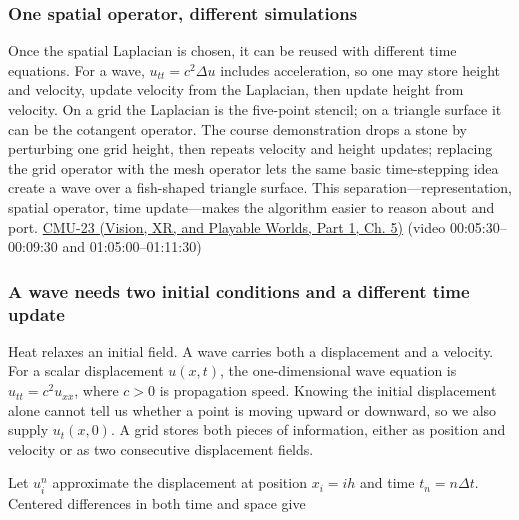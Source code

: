 \subsubsection{One spatial operator, different simulations}\label{04-visual-computing-ii-ch030-one-spatial-operator-different-simulations}

\hypertarget{04-visual-computing-ii-ch030-one-spatial-operator-different-simulations}{}

Once the spatial Laplacian is chosen, it can be reused with different time equations. For a wave, \(u_{tt}=c^2\Delta u\) includes acceleration, so one may store height and velocity, update velocity from the Laplacian, then update height from velocity. On a grid the Laplacian is the five-point stencil; on a triangle surface it can be the cotangent operator. The course demonstration drops a stone by perturbing one grid height, then repeats velocity and height updates; replacing the grid operator with the mesh operator lets the same basic time-stepping idea create a wave over a fish-shaped triangle surface. This separation---representation, spatial operator, time update---makes the algorithm easier to reason about and port. \href{../07-Vision-XR-and-Playable-Worlds-P01/main.pdf\#nameddest=04-visual-computing-ii-ch036-cmu-23---physically-based-animation-and-pdes}{CMU-23 (Vision, XR, and Playable Worlds, Part 1, Ch. 5)} (video 00:05:30--00:09:30 and 01:05:00--01:11:30)

\subsubsection{A wave needs two initial conditions and a different time update}\label{04-visual-computing-ii-ch030-a-wave-needs-two-initial-conditions-and-a-different-time-update}

\hypertarget{04-visual-computing-ii-ch030-a-wave-needs-two-initial-conditions-and-a-different-time-update}{}

Heat relaxes an initial field. A wave carries both a displacement and a velocity. For a scalar displacement \(u(x,t)\), the one-dimensional wave equation is \(u_{tt}=c^2u_{xx}\), where \(c>0\) is propagation speed. Knowing the initial displacement alone cannot tell us whether a point is moving upward or downward, so we also supply \(u_t(x,0)\). A grid stores both pieces of information, either as position and velocity or as two consecutive displacement fields.

Let \(u_i^n\) approximate the displacement at position \(x_i=i h\) and time \(t_n=n\Delta t\). Centered differences in both time and space give

